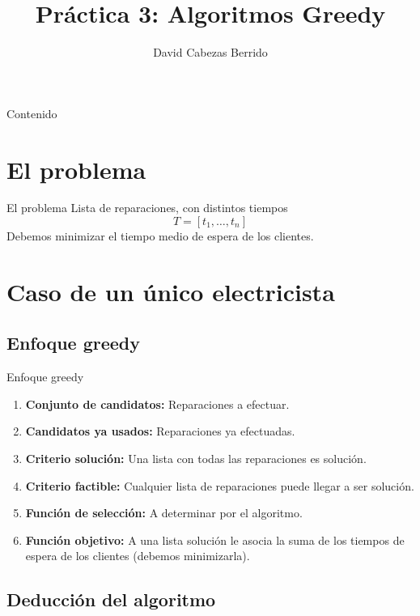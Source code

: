 \documentclass[serif,9pt]{beamer}
\begin{document}
\title{Práctica 3: Algoritmos Greedy}  
\author{David Cabezas Berrido}
\date{}

\begin{frame}
\titlepage
\end{frame}

\begin{frame}{Contenido}
\tableofcontents
\end{frame} 

\section{El problema}

\begin{frame}{El problema}
Lista de reparaciones, con distintos tiempos
\[T=[t_1,\ldots,t_n]\]
Debemos minimizar el tiempo medio de espera de los clientes.
\end{frame}

\section{Caso de un único electricista}

\subsection{Enfoque greedy}

\begin{frame}{Enfoque greedy}
\begin{enumerate}
\item \textbf{Conjunto de candidatos:} Reparaciones a efectuar.
  \pause
\item \textbf{Candidatos ya usados:} Reparaciones ya efectuadas.
  \pause
\item \textbf{Criterio solución:} Una lista con todas las reparaciones
  es solución.
  \pause
\item \textbf{Criterio factible:} Cualquier lista de reparaciones
  puede llegar a ser solución.
  \pause
\item \textbf{Función de selección:} A determinar por el algoritmo.
  \pause
\item \textbf{Función objetivo:} A una lista solución le asocia la
  suma de los tiempos de espera de los clientes (debemos minimizarla).
\end{enumerate}
\end{frame}

\subsection{Deducción del algoritmo}
\end{document}
